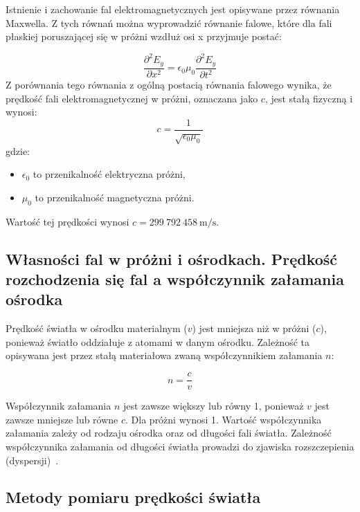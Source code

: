 \documentclass[a4paper,12pt]{article}
\begin{document}
Istnienie i zachowanie fal elektromagnetycznych jest opisywane przez równania Maxwella. Z tych równań można wyprowadzić równanie falowe, które dla fali płaskiej poruszającej się w próżni wzdłuż osi x przyjmuje postać:

$$
    \frac{\partial^2 E_y}{\partial x^2} = \epsilon_0 \mu_0 \frac{\partial^2 E_y}{\partial t^2}
$$
Z porównania tego równania z ogólną postacią równania falowego wynika, że prędkość fali elektromagnetycznej w próżni, oznaczana jako $c$, jest stałą fizyczną i wynosi:
$$
    c = \frac{1}{\sqrt{\epsilon_0 \mu_0}}
$$
gdzie:
\begin{itemize}
    \item $\epsilon_0$ to przenikalność elektryczna próżni,
    \item $\mu_0$ to przenikalność magnetyczna próżni.
\end{itemize}

Wartość tej prędkości wynosi $c = 299 \ 792 \ 458 \ \text{m/s}$.\citep{fizyka_dla_szkol_wyzszych_tom_3}

\subsection*{Własności fal w próżni i ośrodkach. Prędkość rozchodzenia się fal a współczynnik załamania ośrodka}

Prędkość światła w ośrodku materialnym ($v$) jest mniejsza niż w próżni ($c$), ponieważ światło oddziałuje z atomami w danym ośrodku. Zależność ta opisywana jest przez stałą materiałowa zwaną współczynnikiem załamania $n$:

$$
    n = \frac{c}{v}
$$

Współczynnik załamania $n$ jest zawsze większy lub równy 1, ponieważ $v$ jest zawsze mniejsze lub równe $c$. Dla próżni wynosi 1.
Wartość współczynnika załamania zależy od rodzaju ośrodka oraz od długości fali światła.
Zależność współczynnika załamania od długości światła prowadzi do zjawiska rozszczepienia (dyspersji)~\citep{fizyka_dla_szkol_wyzszych_tom_3}.

\subsection*{Metody pomiaru prędkości światła}
\end{document}
